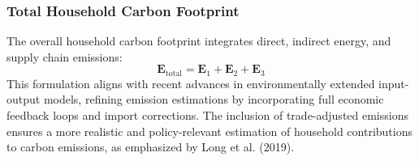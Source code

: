 \documentclass[12pt,a4paper]{article}
\begin{document}
\subsubsection*{Total Household Carbon Footprint}
The overall household carbon footprint integrates direct, indirect energy, and supply chain emissions:
\begin{equation}
    \mathbf{E}_{\text{total}} = \mathbf{E}_1 + \mathbf{E}_2 + \mathbf{E}_3
\end{equation}
This formulation aligns with recent advances in environmentally extended input-output models, refining emission estimations by incorporating full economic feedback loops and import corrections. The inclusion of trade-adjusted emissions ensures a more realistic and policy-relevant estimation of household contributions to carbon emissions, as emphasized by Long et al. (2019).
\end{document}
